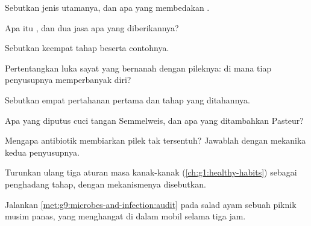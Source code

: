 \begin{exercise}[$\star$]\label{exo:g9:microbes-and-infection:1}
Sebutkan jenis  utamanya, dan apa yang membedakan .
\end{exercise}

\begin{exercise}[$\star$]\label{exo:g9:microbes-and-infection:2}
Apa itu , dan dua jasa apa yang diberikannya?
\end{exercise}

\begin{exercise}[$\star$]\label{exo:g9:microbes-and-infection:3}
Sebutkan keempat tahap  beserta contohnya.
\end{exercise}

\begin{exercise}[$\star$]\label{exo:g9:microbes-and-infection:4}
Pertentangkan luka sayat yang bernanah dengan pileknya: di
mana tiap penyusupnya memperbanyak diri?
\end{exercise}

\begin{exercise}[$\star$]\label{exo:g9:microbes-and-infection:5}
Sebutkan empat pertahanan pertama dan tahap yang ditahannya.
\end{exercise}

\begin{exercise}[$\star$]\label{exo:g9:microbes-and-infection:6}
Apa yang diputus cuci tangan Semmelweis, dan apa yang
ditambahkan Pasteur?
\end{exercise}

\begin{exercise}[$\star\star$]\label{exo:g9:microbes-and-infection:7}
Mengapa antibiotik membiarkan pilek tak tersentuh? Jawablah
dengan mekanika kedua penyusupnya.
\end{exercise}

\begin{exercise}[$\star\star$]\label{exo:g9:microbes-and-infection:8}
Turunkan ulang tiga aturan  masa kanak-kanak
(\cref{ch:g1:healthy-habits}) sebagai penghadang tahap,
dengan mekanismenya disebutkan.
\end{exercise}

\begin{exercise}[$\star\star$]\label{exo:g9:microbes-and-infection:9}
Jalankan \cref{met:g9:microbes-and-infection:audit} pada
salad ayam sebuah piknik musim panas, yang menghangat di
dalam mobil selama tiga jam.
\end{exercise}


